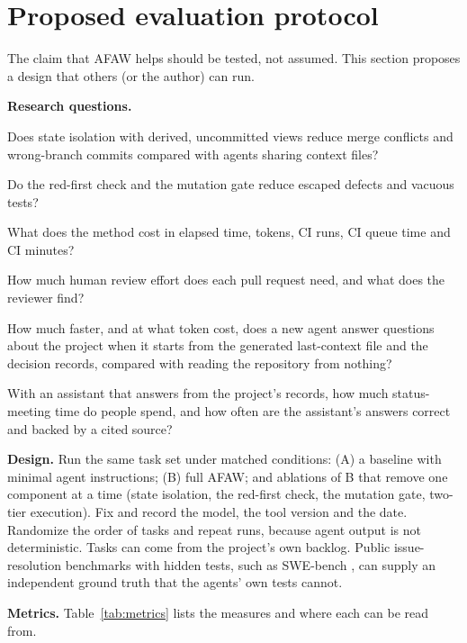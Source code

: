\documentclass[11pt,a4paper]{article}
\begin{document}
\section{Proposed evaluation protocol}
\label{sec:eval}

The claim that AFAW helps should be tested, not assumed. This section proposes a design that others (or the author) can run.

\textbf{Research questions.}
\begin{description}[leftmargin=0pt, labelindent=0pt, itemsep=2pt]
  \item[RQ1] Does state isolation with derived, uncommitted views reduce merge conflicts and wrong-branch commits compared with agents sharing context files?
  \item[RQ2] Do the red-first check and the mutation gate reduce escaped defects and vacuous tests?
  \item[RQ3] What does the method cost in elapsed time, tokens, CI runs, CI queue time and CI minutes?
  \item[RQ4] How much human review effort does each pull request need, and what does the reviewer find?
  \item[RQ5] How much faster, and at what token cost, does a new agent answer questions about the project when it starts from the generated last-context file and the decision records, compared with reading the repository from nothing?
  \item[RQ6] With an assistant that answers from the project's records, how much status-meeting time do people spend, and how often are the assistant's answers correct and backed by a cited source?
\end{description}

\textbf{Design.} Run the same task set under matched conditions: (A) a baseline with minimal agent instructions; (B) full AFAW; and ablations of B that remove one component at a time (state isolation, the red-first check, the mutation gate, two-tier execution). Fix and record the model, the tool version and the date. Randomize the order of tasks and repeat runs, because agent output is not deterministic. Tasks can come from the project's own backlog. Public issue-resolution benchmarks with hidden tests, such as SWE-bench \cite{jimenez2024}, can supply an independent ground truth that the agents' own tests cannot.

\textbf{Metrics.} Table~\ref{tab:metrics} lists the measures and where each can be read from.
\end{document}
